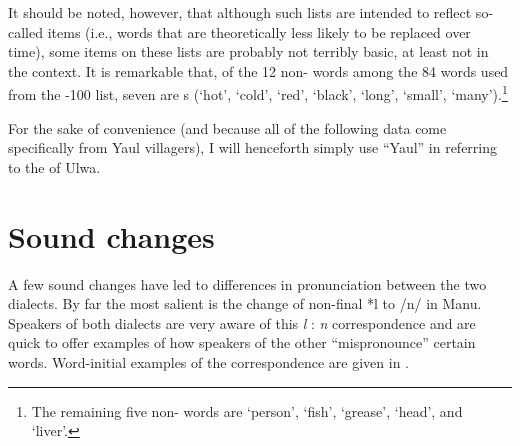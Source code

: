 It should be noted, however, that although such lists are intended to reflect so-called  items (i.e., words that are theoretically less likely to be replaced over time), some items on these lists are probably not terribly basic, at least not in the  context. It is remarkable that, of the 12 non- words among the 84 words used from the  -100 list, seven are s (‘hot’, ‘cold’, ‘red’, ‘black’, ‘long’, ‘small’, ‘many’).\footnote{The remaining five non- words are ‘person’, ‘fish’, ‘grease’, ‘head’, and ‘liver’.}

  For the sake of convenience (and because all of the following data come specifically from Yaul villagers), I will henceforth simply use “Yaul” in referring to the   of Ulwa.



\section{\label{sec:18.2}  Sound changes}


A few sound changes have led to differences in pronunciation between the two dialects. By far the most salient is the change of non-final *l to /n/ in Manu. Speakers of both dialects are very aware of this \textit{l} : \textit{n} correspondence and are quick to offer examples of how speakers of the other  “mispronounce” certain words. Word-initial examples of the correspondence are given in .


